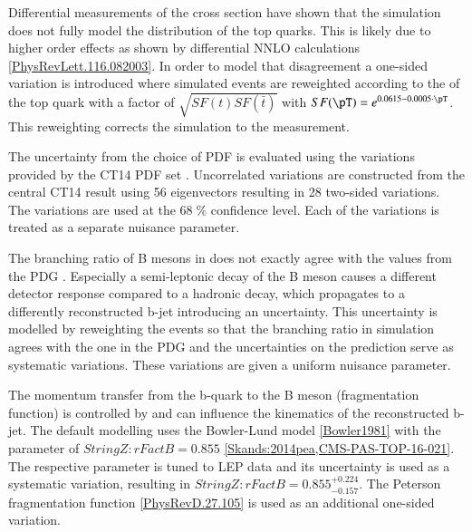 Differential measurements of the \ttbar cross section \cite{CMS-PAS-TOP-16-011} have shown that the simulation does not fully model the \pt distribution of the top quarks.
This is likely due to higher order effects as shown by differential NNLO calculations \ref{PhysRevLett.116.082003}. In order to model that disagreement a one-sided variation is introduced where simulated events are reweighted according to the \pt of the top quark with a factor of $\sqrt{SF(t)SF(\bar{t})}$ with $SF(\pT)=e^{0.0615-0.0005\cdot \pT}$.
This reweighting corrects the simulation to the measurement.

The uncertainty from the choice of PDF is evaluated using the variations provided by the CT14 PDF set \cite{Dulat:2015mca}. Uncorrelated variations are constructed from the central CT14 result using 56 eigenvectors resulting in 28 two-sided variations.
The variations are used at the $68 \;\%$ confidence level. Each of the variations is treated as a separate nuisance parameter.


The branching ratio of B mesons in \PYTHIA does not exactly agree with the values from the PDG  . Especially a semi-leptonic decay of the B meson causes a different detector response compared to a hadronic decay,
which propagates to a differently reconstructed b-jet introducing an uncertainty.
This uncertainty is modelled by reweighting the events so that the branching ratio in simulation agrees with the one in the PDG and the uncertainties on the prediction serve as systematic
variations. These variations are given a uniform nuisance parameter.

The momentum transfer from the b-quark to the B meson (fragmentation function) is controlled by \PYTHIA and can influence the kinematics of the reconstructed b-jet. 
The default modelling uses the Bowler-Lund model \ref{Bowler1981} with the parameter of $StringZ:rFactB = 0.855$ \ref{Skands:2014pea,CMS-PAS-TOP-16-021}.
The respective parameter is tuned to LEP data and its uncertainty is used as a systematic variation, resulting in $StringZ:rFactB = 0.855^{+0.224}_{-0.157}$.
The Peterson fragmentation function \ref{PhysRevD.27.105} is used as an additional one-sided variation. 


